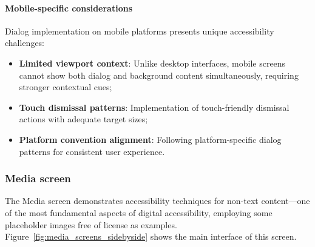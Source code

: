 \paragraph{Mobile-specific considerations}

Dialog implementation on mobile platforms presents unique accessibility challenges:

\begin{itemize}
    \item \textbf{Limited viewport context}: Unlike desktop interfaces, mobile screens cannot show both dialog and background content simultaneously, requiring stronger contextual cues;
    
    \item \textbf{Touch dismissal patterns}: Implementation of touch-friendly dismissal actions with adequate target sizes;
    
    \item \textbf{Platform convention alignment}: Following platform-specific dialog patterns for consistent user experience.
\end{itemize}

\subsubsection{Media screen}
\label{subsubsec:media-screen}

The Media screen demonstrates accessibility techniques for non-text content—one of the most fundamental aspects of digital accessibility, employing some placeholder images free of license as examples.
Figure~\ref{fig:media_screens_sidebyside} shows the main interface of this screen.


